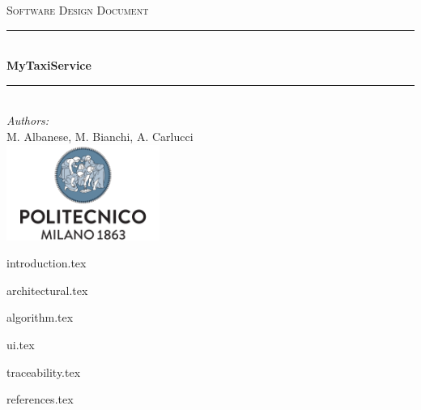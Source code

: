 \documentclass[a4paper,11pt]{article}
\begin{document}
\begin{titlepage}
\begin{center}
\textsc{\LARGE Software Design Document}\\[1.5cm] %
 
\rule{\linewidth}{0.5mm} \\[0.7cm]
{\huge \bfseries MyTaxiService}\\[0.4cm] %
\rule{\linewidth}{0.5mm} \\[1.5cm]
 
\emph{Authors:}\\
M. Albanese, M. Bianchi, A. Carlucci\\[2.0cm] 

\vfill
\vfill
\includegraphics[width=50mm]{polimi.png}\\
\end{center}
\end{titlepage}

\tableofcontents
\pagebreak

{introduction.tex}

{architectural.tex}

{algorithm.tex}

{ui.tex}

{traceability.tex}

{references.tex}
\end{document}
